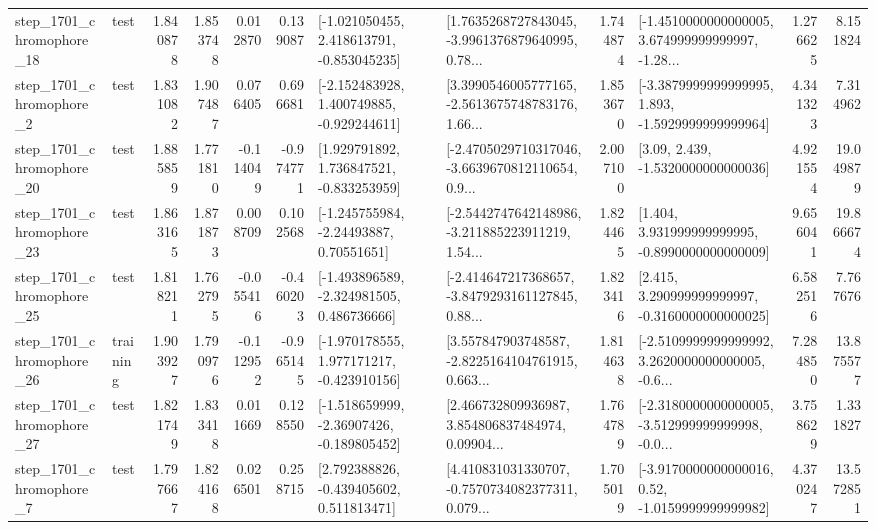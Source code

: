 \begin{tabular}{llrrrrllrlrr}
 step\_1701\_chromophore\_18 &      test &      1.840878 &    1.853748 &      0.012870 &  0.139087 &   [-1.021050455, 2.418613791, -0.853045235] &  [1.7635268727843045, -3.9961376879640995, 0.78... &       1.744874 &  [-1.4510000000000005, 3.674999999999997, -1.28... &            1.276625 &          8.151824 \\
  step\_1701\_chromophore\_2 &      test &      1.831082 &    1.907487 &      0.076405 &  0.696681 &   [-2.152483928, 1.400749885, -0.929244611] &  [3.3990546005777165, -2.5613675748783176, 1.66... &       1.853670 &  [-3.3879999999999995, 1.893, -1.5929999999999964] &            4.341323 &          7.314962 \\
 step\_1701\_chromophore\_20 &      test &      1.885859 &    1.771810 &     -0.114049 & -0.974771 &    [1.929791892, 1.736847521, -0.833253959] &  [-2.4705029710317046, -3.6639670812110654, 0.9... &       2.007100 &                 [3.09, 2.439, -1.5320000000000036] &            4.921554 &         19.049879 \\
 step\_1701\_chromophore\_23 &      test &      1.863165 &    1.871873 &      0.008709 &  0.102568 &     [-1.245755984, -2.24493887, 0.70551651] &  [-2.5442747642148986, -3.211885223911219, 1.54... &       1.824465 &    [1.404, 3.931999999999995, -0.8990000000000009] &            9.656041 &         19.866674 \\
 step\_1701\_chromophore\_25 &      test &      1.818211 &    1.762795 &     -0.055416 & -0.460203 &   [-1.493896589, -2.324981505, 0.486736666] &  [-2.414647217368657, -3.8479293161127845, 0.88... &       1.823416 &    [2.415, 3.290999999999997, -0.3160000000000025] &            6.582516 &          7.767676 \\
 step\_1701\_chromophore\_26 &  training &      1.903927 &    1.790976 &     -0.112952 & -0.965145 &   [-1.970178555, 1.977171217, -0.423910156] &  [3.557847903748587, -2.8225164104761915, 0.663... &       1.814638 &  [-2.5109999999999992, 3.2620000000000005, -0.6... &            7.284850 &         13.875577 \\
 step\_1701\_chromophore\_27 &      test &      1.821749 &    1.833418 &      0.011669 &  0.128550 &   [-1.518659999, -2.36907426, -0.189805452] &  [2.466732809936987, 3.854806837484974, 0.09904... &       1.764789 &  [-2.3180000000000005, -3.512999999999998, -0.0... &            3.758629 &          1.331827 \\
  step\_1701\_chromophore\_7 &      test &      1.797667 &    1.824168 &      0.026501 &  0.258715 &    [2.792388826, -0.439405602, 0.511813471] &  [4.410831031330707, -0.7570734082377311, 0.079... &       1.705019 &   [-3.9170000000000016, 0.52, -1.0159999999999982] &            4.370247 &         13.572851 \\

\end{tabular}
